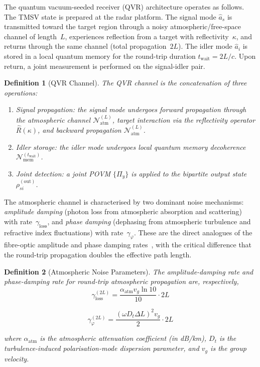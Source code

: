 \documentclass[journal]{IEEEtran}
\newtheorem{definition}{Definition}
\begin{document}
The quantum vacuum-seeded receiver (QVR) architecture operates as follows. The TMSV state is prepared at the radar platform. The signal mode $\hat{a}_s$ is transmitted toward the target region through a noisy atmospheric/free-space channel of length~$L$, experiences reflection from a target with reflectivity~$\kappa$, and returns through the same channel (total propagation~$2L$). The idler mode $\hat{a}_i$ is stored in a local quantum memory for the round-trip duration $t_{\text{wait}} = 2L/c$. Upon return, a joint measurement is performed on the signal-idler pair.

\begin{definition}[QVR Channel]\label{def:qvr_channel}
The QVR channel is the concatenation of three operations:
\begin{enumerate}
    \item[(i)] \textit{Signal propagation}: the signal mode undergoes forward propagation through the atmospheric channel $\mathcal{N}_{\text{atm}}^{(L)}$, target interaction via the reflectivity operator $\hat{R}(\kappa)$, and backward propagation $\mathcal{N}_{\text{atm}}^{(L)}$.
    \item[(ii)] \textit{Idler storage}: the idler mode undergoes local quantum memory decoherence $\mathcal{N}_{\text{mem}}^{(t_{\text{wait}})}$.
    \item[(iii)] \textit{Joint detection}: a joint POVM $\{\Pi_y\}$ is applied to the bipartite output state $\rho_{si}^{(\text{out})}$.
\end{enumerate}
\end{definition}

The atmospheric channel is characterised by two dominant noise mechanisms: \textit{amplitude damping} (photon loss from atmospheric absorption and scattering) with rate~$\gamma_{\text{loss}}$, and \textit{phase damping} (dephasing from atmospheric turbulence and refractive index fluctuations) with rate~$\gamma_{\varphi}$. These are the direct analogues of the fibre-optic amplitude and phase damping rates~\cite{gautum2024rigorous}, with the critical difference that the round-trip propagation doubles the effective path length.

\begin{definition}[Atmospheric Noise Parameters]\label{def:atm_noise}
The amplitude-damping rate and phase-damping rate for round-trip atmospheric propagation are, respectively,
\begin{equation}\label{eq:atm_noise_rates}
\gamma_{\text{loss}}^{(2L)} = \frac{\alpha_{\text{atm}} v_g \ln 10}{10} \cdot 2L
\end{equation}

\begin{equation}\label{eq:atm_noise_rates}
\gamma_{\varphi}^{(2L)} = \frac{(\omega D_t \Delta L)^2 v_g}{2} \cdot 2L
\end{equation}

where $\alpha_{\text{atm}}$ is the atmospheric attenuation coefficient (in dB/km), $D_t$ is the turbulence-induced polarisation-mode dispersion parameter, and $v_g$ is the group velocity.
\end{definition}
\end{document}
